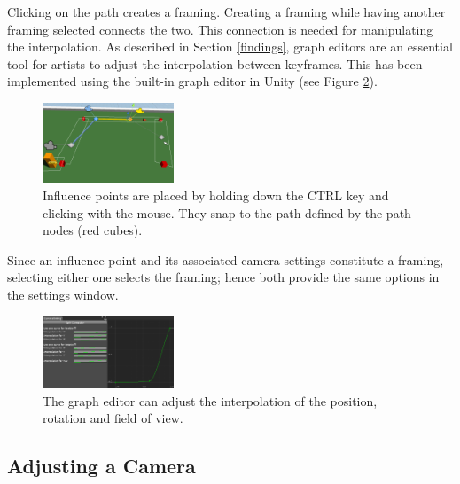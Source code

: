 Clicking on the path creates a framing. Creating a framing while having another framing selected connects the two. This connection is needed for manipulating the interpolation. As described in Section \ref{findings}, graph editors are an essential tool for artists to adjust the interpolation between keyframes. This has been implemented using the built-in graph editor in Unity (see Figure \ref{fig:curve}).

\begin{figure}[htbp]
\centering
\includegraphics[width=0.35\textwidth]{Pics/placingInfluencePoint}
\caption{Influence points are placed by holding down the CTRL key and clicking with the mouse. They snap to the path defined by the path nodes (red cubes).}
\label{fig:placingInfluencePoint}
\end{figure}


Since an influence point and its associated camera settings constitute a framing, selecting either one selects the framing; hence both provide the same options in the settings window.

\begin{figure}[htbp]
\centering
\includegraphics[width=0.35\textwidth]{Pics/curve}
\caption{The graph editor can adjust the interpolation of the position, rotation and field of view.}
\label{fig:curve}
\end{figure}
\subsection{Adjusting a Camera}

